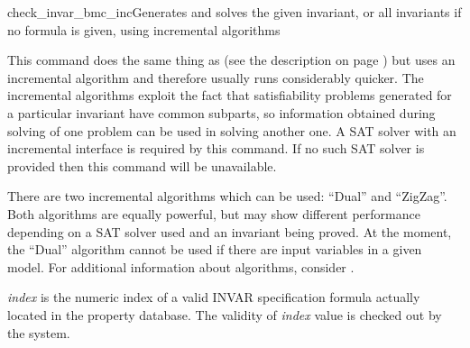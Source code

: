 \begin{nusmvCommand}{check\_invar\_bmc\_inc}{Generates and solves the given 
invariant, or all invariants if no formula is given, using incremental algorithms}
 

This command does the same thing as  (see the
description on page \pageref{checkInvarBmcCommand}) but uses an
incremental algorithm and therefore usually runs considerably
quicker. The incremental algorithms exploit the fact that
satisfiability problems generated for a particular invariant have
common subparts, so information obtained during solving of one problem
can be used in solving another one. A SAT solver with an incremental
interface is required by this command. If no such SAT solver is
provided then this command will be unavailable.

There are two incremental algorithms which can be used: ``Dual'' and
``ZigZag''. Both algorithms are equally powerful, but may show
different performance depending on a SAT solver used and an invariant
being proved.  At the moment, the ``Dual'' algorithm cannot be used if
there are input variables in a given model. For additional information
about algorithms, consider \cite{een04temporal}.

\begin{cmdOpt}

 { {\it index} is the numeric index of a valid
INVAR specification formula actually located in the property
database.  The validity of {\it index} value is checked out by the
system.}
       
            


\end{cmdOpt}

\end{nusmvCommand}
